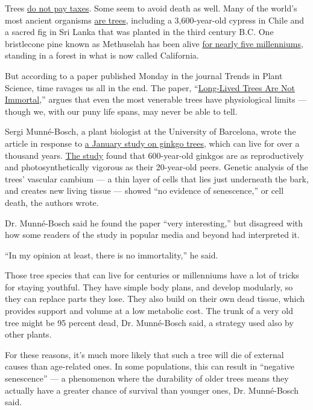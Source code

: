 Trees
\href{https://dghaskell.com/2016/02/03/the-tree-that-owns-itself/}{do
not pay taxes}. Some seem to avoid death as well. Many of the world's
most ancient organisms \href{http://www.rmtrr.org/oldlist.htm}{are
trees}, including a 3,600-year-old cypress in Chile and a sacred fig in
Sri Lanka that was planted in the third century B.C. One bristlecone
pine known as Methuselah has been alive
\href{https://www.nytimes3xbfgragh.onion/2003/06/17/science/at-age-4600-plus-methuselah-pine-tree-begets-new-offspring.html}{for
nearly five millenniums}, standing in a forest in what is now called
California.

But according to a paper published Monday in the journal Trends in Plant
Science, time ravages us all in the end. The paper,
``\href{https://doi.org/10.1016/j.tplants.2020.06.006}{Long-Lived Trees
Are Not Immortal},'' argues that even the most venerable trees have
physiological limits --- though we, with our puny life spans, may never
be able to tell.

Sergi Munné-Bosch, a plant biologist at the University of Barcelona,
wrote the article in response to
\href{https://www.nytimes3xbfgragh.onion/2020/01/13/science/oldest-trees-ginkgos.html}{a
January study on ginkgo trees}, which can live for over a thousand
years. \href{https://www.pnas.org/content/117/4/2201}{The study} found
that 600-year-old ginkgos are as reproductively and photosynthetically
vigorous as their 20-year-old peers. Genetic analysis of the trees'
vascular cambium --- a thin layer of cells that lies just underneath the
bark, and creates new living tissue --- showed ``no evidence of
senescence,'' or cell death, the authors wrote.

Dr. Munné-Bosch said he found the paper ``very interesting,'' but
disagreed with how some readers of the study in popular media and beyond
had interpreted it.

``In my opinion at least, there is no immortality,'' he said.

Those tree species that can live for centuries or millenniums have a lot
of tricks for staying youthful. They have simple body plans, and develop
modularly, so they can replace parts they lose. They also build on their
own dead tissue, which provides support and volume at a low metabolic
cost. The trunk of a very old tree might be 95 percent dead, Dr.
Munné-Bosch said, a strategy used also by other plants.

For these reasons, it's much more likely that such a tree will die of
external causes than age-related ones. In some populations, this can
result in ``negative senescence'' --- a phenomenon where the durability
of older trees means they actually have a greater chance of survival
than younger ones, Dr. Munné-Bosch said.

